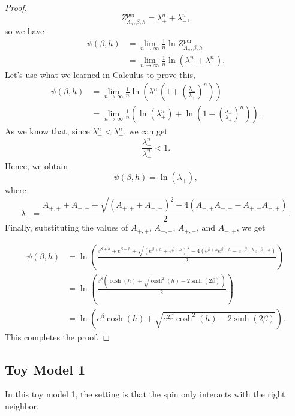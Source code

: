 \documentclass[11pt]{book}
\begin{document}
\begin{proof}
\begin{equation}\label{partition_function_trace}
Z^{\text{per}}_{\Lambda_n,\beta,h} = \lambda_+^n + \lambda_-^n,
\end{equation}
so we have
\begin{align*}
    \psi(\beta,h) &= \lim_{n \to \infty} \frac{1}{n}\ln Z^{\text{per}}_{\Lambda_n,\beta,h} \\
    &= \lim_{n \to \infty} \frac{1}{n}\ln(\lambda_+^n + \lambda_-^n).
\end{align*}
Let's use what we learned in Calculus to prove this,
\begin{align*}
    \psi(\beta,h) &= \lim_{n \to \infty} \frac{1}{n} \ln \left(\lambda_+^n(1 + (\frac{\lambda_-}{\lambda_+})^n) \right) \\
    &= \lim_{n \to \infty} \frac{1}{n} \left( \ln(\lambda_+^n) + \ln(1 + (\frac{\lambda_-}{\lambda_+})^n) \right). 
\end{align*}
As we know that, since
$\lambda_-^n<\lambda_+^n$, we can get
\[
\frac{\lambda_-^n}{\lambda_+^n}<1.
\]
Hence, we obtain
\begin{equation}\label{pressure_function_lambda}
\psi(\beta,h) = \ln(\lambda_+),
\end{equation}
where
$$
\lambda_+ = \frac{A_{+,+} + A_{-,-} + \sqrt{(A_{+,+} + A_{-,-})^2 - 4(A_{+,+}A_{-,-} - A_{+,-}A_{-,+})}}{2}.
$$
Finally, substituting the values of $A_{+,+}$, $A_{-,-}$, $A_{+,-}$, and $A_{-,+}$, we get

\begin{align*}
\psi(\beta,h) &= \ln \left( \frac{e^{\beta + h} + e^{\beta - h} + \sqrt{(e^{\beta + h} + e^{\beta - h})^2 - 4(e^{\beta + h}e^{\beta - h} - e^{-\beta + h}e^{-\beta - h})}}{2} \right) \\
&= \ln \left( \frac{e^{\beta} (\cosh(h) + \sqrt{\cosh^2(h) - 2\sinh(2\beta)})}{2} \right) \\
&= \ln \left( e^{\beta} \cosh(h) + \sqrt{e^{2\beta} \cosh^2(h) - 2\sinh(2\beta)} \right).
\end{align*}
This completes the proof.
\end{proof}




\subsection{Toy Model 1}

In this toy model 1, the setting is that the spin only interacts with the right neighbor.
\end{document}
